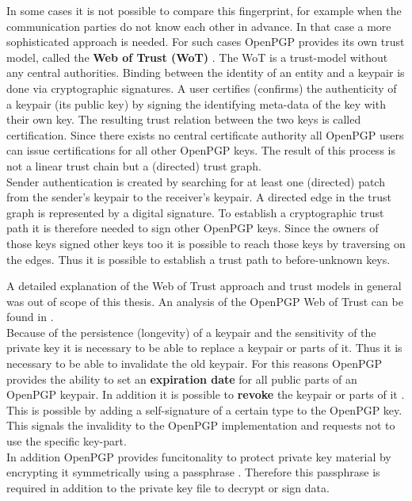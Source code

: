 In some cases it is not possible to compare this fingerprint, for example when the communication parties do not know each other in advance. In that case a more sophisticated approach is needed. For such cases OpenPGP provides its own trust model, called the \textbf{Web of Trust (WoT)} \cite{PGP2manual}. The WoT is a trust-model without any central authorities. Binding between the identity of an entity and a keypair is done via cryptographic signatures. A user certifies (confirms) the authenticity of a keypair (its public key) by signing the identifying meta-data of the key with their own key. The resulting trust relation between the two keys is called certification. Since there exists no central certificate authority all OpenPGP users can issue certifications for all other OpenPGP keys. The result of this process is not a linear trust chain but a (directed) trust graph. \\

Sender authentication is created by searching for at least one (directed) patch from the sender's keypair to the receiver's keypair. A directed edge in the trust graph is represented by a digital signature. To establish a cryptographic trust path it is therefore needed to sign other OpenPGP keys. Since the owners of those keys signed other keys too it is possible to reach those keys by traversing on the edges. Thus it is possible to establish a trust path to before-unknown keys.

A detailed explanation of the Web of Trust approach and trust models in general was out of scope of this thesis. An analysis of the OpenPGP Web of Trust can be found in \cite{Ulrich2011}. \\


Because of the persistence (longevity) of a keypair and the sensitivity of the private key it is necessary to be able to replace a keypair or parts of it. Thus it is necessary to be able to invalidate the old keypair. For this reasons OpenPGP provides the ability to set an \textbf{expiration date} for all public parts of an OpenPGP keypair. In addition it is possible to \textbf{revoke} the keypair or parts of it \cite[section 5.2]{RFC4880}. This is possible by adding a self-signature of a certain type to the OpenPGP key. This signals the invalidity to the OpenPGP implementation and requests not to use the specific key-part. \\

In addition OpenPGP provides funcitonality to protect private key material by encrypting it symmetrically using a passphrase \cite[section 3.7]{RFC4880}. Therefore this passphrase is required in addition to the private key file to decrypt or sign data.

